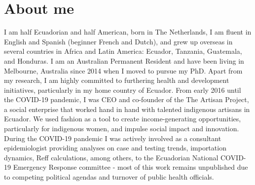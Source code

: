 \documentclass[11pt,a4paper,]{awesome-cv}
\begin{document}
\hypertarget{about-me}{%
\section{About me}\label{about-me}}

I am half Ecuadorian and half American, born in The Netherlands, I am
fluent in English and Spanish (beginner French and Dutch), and grew up
overseas in several countries in Africa and Latin America: Ecuador,
Tanzania, Guatemala, and Honduras. I am an Australian Permanent Resident
and have been living in Melbourne, Australia since 2014 when I moved to
pursue my PhD. Apart from my research, I am highly committed to
furthering health and development initiatives, particularly in my home
country of Ecuador. From early 2016 until the COVID-19 pandemic, I was
CEO and co-founder of the The Artisan Project, a social enterprise that
worked hand in hand with talented indigenous artisans in Ecuador. We
used fashion as a tool to create income-generating opportunities,
particularly for indigenous women, and impulse social impact and
innovation. During the COVID-19 pandemic I was actively involved as a
consultant epidemiologist providing analyses on case and testing trends,
importation dynamics, Reff calculations, among others, to the Ecuadorian
National COVID-19 Emergency Response committee - most of this work
remains unpublished due to competing political agendas and turnover of
public health officials.


\label{LastPage}~
\end{document}
